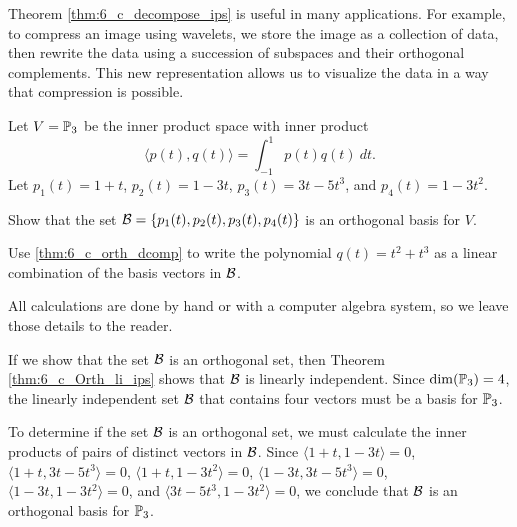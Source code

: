 Theorem \ref{thm:6_c_decompose_ips} is useful in many applications. For example, to compress an image using wavelets, we store the image as a collection of data, then rewrite the data using a succession of subspaces and their orthogonal complements.  This new representation allows us to visualize the data in a way that compression is possible. 


\ExampleIntro

\begin{example} Let $V = \mathbb{P}_3$ be the inner product space with inner product 
\[\langle p(t), q(t) \rangle = \int_{-1}^1 p(t)q(t) \ dt.\]
Let $p_1(t) = 1+t$, $p_2(t) = 1-3t$, $p_3(t) = 3t-5t^3$, and $p_4(t) = 1-3t^2$. 
\ba
\item Show that the set $\mathcal{B} = \{p_1(t), p_2(t), p_3(t), p_4(t)\}$ is an orthogonal basis for $V$.

\item  Use  \ref{thm:6_c_orth_dcomp} to write the polynomial $q(t) = t^2+t^3$ as a linear combination of the basis vectors in $\mathcal{B}$. 

\ea

\ExampleSolution All calculations are done by hand or with a computer algebra system, so we leave those details to the reader. 
\ba
\item If we show that the set $\mathcal{B}$ is an orthogonal set, then Theorem \ref{thm:6_c_Orth_li_ips} shows that $\mathcal{B}$ is linearly independent. Since $\dim(\mathbb{P}_3) = 4$, the linearly independent set $\mathcal{B}$ that contains four vectors must be a basis for $\mathbb{P}_3$. 

To determine if the set $\mathcal{B}$ is an orthogonal set, we must calculate the inner products of pairs of distinct vectors in $\mathcal{B}$. Since $\langle 1+t,1-3t \rangle = 0$, $\langle 1+t,3t-5t^3 \rangle = 0$, $\langle 1+t,1-3t^2 \rangle = 0$, $\langle 1-3t,3t-5t^3 \rangle = 0$, $\langle 1-3t,1-3t^2 \rangle = 0$, and $\langle 3t-5t^3,1-3t^2 \rangle = 0$, we conclude that $\mathcal{B}$ is an orthogonal basis for $\mathbb{P}_3$. 


\end{example}
